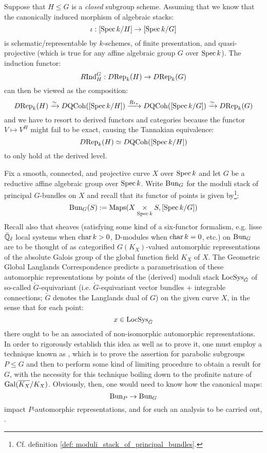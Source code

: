             \begin{corollary}
                Suppose that $H \leq G$ is a \textit{closed} subgroup scheme. Assuming that we know that the canonically induced morphism of algebraic stacks:
                    $$\iota: [\operatorname{Spec} k/H] \to [\operatorname{Spec} k/G]$$
                is schematic/representable by $k$-schemes, of finite presentation, and quasi-projective (which is true for any affine algebraic group $G$ over $\operatorname{Spec} k$). The induction functor:
                    $$R\mathrm{Ind}_H^G: D\mathrm{Rep}_k(H) \to D\mathrm{Rep}_k(G)$$
                can then be viewed as the composition:
                    $$D\mathrm{Rep}_k(H) \xrightarrow[]{\simeq} D\mathrm{QCoh}([\operatorname{Spec} k/H]) \xrightarrow[]{R\iota_*} D\mathrm{QCoh}([\operatorname{Spec} k/G]) \xrightarrow[]{\simeq} D\mathrm{Rep}_k(G)$$
                and we have to resort to derived functors and categories because the functor $V \mapsto V^H$ might fail to be exact, causing the Tannakian equivalence:
                    $$D\mathrm{Rep}_k(H) \simeq D\mathrm{QCoh}([\operatorname{Spec} k/H])$$
                to only hold at the derived level.
            \end{corollary}
            \begin{remark}
                Fix a smooth, connected, and projective curve $X$ over $\operatorname{Spec} k$ and let $G$ be a reductive affine algebraic group over $\operatorname{Spec} k$. Write $\mathrm{Bun}_G$ for the moduli stack of principal $G$-bundles on $X$ and recall that its functor of points is given by\footnote{Cf. definition \ref{def: moduli_stack_of_principal_bundles}.}:
                    $$\Bun_G(S) := \Maps(X \x_{\Spec k} S, [\Spec k/G])$$
                Recall also that sheaves (satisfying some kind of a six-functor formalism, e.g. lisse $\bar{\mathbb{Q}}_{\ell}$ local systems when $\operatorname{char} k > 0$, D-modules when $\operatorname{char} k = 0$, etc.) on $\mathrm{Bun}_G$ are to be thought of as categorified $G(K_X)$-valued automorphic representations of the absolute Galois group of the global function field $K_X$ of $X$. The Geometric Global Langlands Correspondence predicts a parametrisation of these automorphic representations by points of the (derived) moduli stack $\mathrm{LocSys}_{\check{G}}$ of so-called $\check{G}$-equivariant  (i.e. $\check{G}$-equivariant vector bundles + integrable connections; $\check{G}$ denotes the Langlands dual of $G$) on the given curve $X$, in the sense that for each point:
                    $$x \in \mathrm{LocSys}_{\check{G}}$$
                there ought to be an associated  of non-isomorphic automorphic representations. In order to rigorously establish this idea as well as to prove it, one must employ a technique known as , which is to prove the assertion for parabolic subgroups $P \leq G$ and then to perform some kind of limiting procedure to obtain a result for $G$, with the necessity for this technique boiling down to the profinite nature of $\mathrm{Gal}(\overline{K_X}/K_X)$. Obviously, then, one would need to know how the canonical maps:
                    $$\mathrm{Bun}_P \to \mathrm{Bun}_G$$
                impact $P$-automorphic representations, and for such an analysis to be carried out, .
            \end{remark}
    
